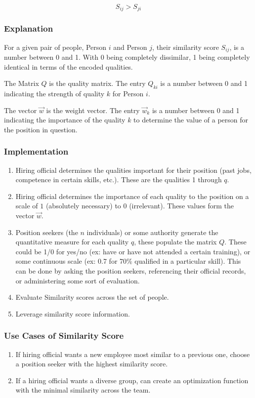 \[S_{ij} > S_{ji}\]

\subsubsection{Explanation}

For a given pair of people, Person $i$ and Person $j$, their similarity score $S_{ij}$, is a number between 0 and 1. With 0 being completely dissimilar, 1 being completely identical in terms of the encoded qualities. 

The Matrix $Q$ is the quality matrix. The entry $Q_{ki}$ is a number between 0 and 1 indicating the strength of quality $k$ for Person $i$.

The vector $\vec{w}$ is the weight vector. The entry $\vec{w}_k$ is a number between 0 and 1 indicating the importance of the quality $k$ to determine the value of a person for the position in question.


\subsubsection{Implementation}

\begin{enumerate}
\item Hiring official determines the qualities important for their position (past jobs, competence in certain skills, etc.). These are the qualities 1 through $q$.
\item Hiring official determines the importance of each quality to the position on a scale of $1$ (absolutely necessary) to $0$ (irrelevant). These values form the vector $\vec{w}$.
\item Position seekers (the $n$ individuals) or some authority generate the quantitative measure for each quality $q$, these populate the matrix $Q$. These could be 1/0 for yes/no (ex: have or have not attended a certain training), or some continuous scale (ex: 0.7 for 70\% qualified in a particular skill). This can be done by asking the position seekers, referencing their official records, or administering some sort of evaluation.
\item Evaluate Similarity scores across the set of people.
\item Leverage similarity score information.
\end{enumerate}

\subsubsection{Use Cases of Similarity Score}

\begin{enumerate}
\item If hiring official wants a new employee most similar to a previous one, choose a position seeker with the highest similarity score.
\item If a hiring official wants a diverse group, can create an optimization function with the minimal similarity across the team.
\end{enumerate}